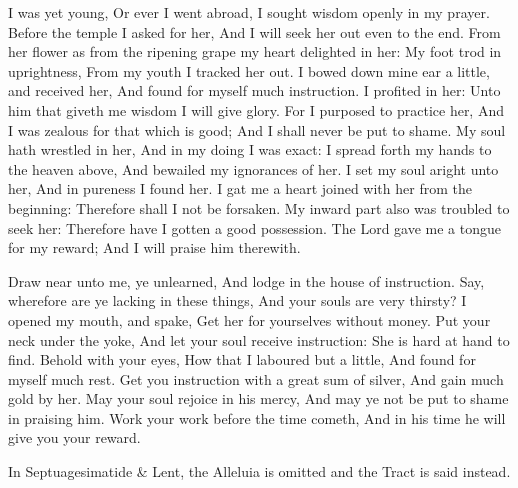  I was yet young, Or ever I went abroad, I sought wisdom openly in my prayer. Before the temple I asked for her, And I will seek her out even to the end. From her flower as from the ripening grape my heart delighted in her: My foot trod in uprightness, From my youth I tracked her out. I bowed down mine ear a little, and received her, And found for myself much instruction. I profited in her: Unto him that giveth me wisdom I will give glory. For I purposed to practice her, And I was zealous for that which is good; And I shall never be put to shame. My soul hath wrestled in her, And in my doing I was exact: I spread forth my hands to the heaven above, And bewailed my ignorances of her. I set my soul aright unto her, And in pureness I found her. I gat me a heart joined with her from the beginning: Therefore shall I not be forsaken. My inward part also was troubled to seek her: Therefore have I gotten a good possession. The Lord gave me a tongue for my reward; And I will praise him therewith.
\par
Draw near unto me, ye unlearned, And lodge in the house of instruction. Say, wherefore are ye lacking in these things, And your souls are very thirsty? I opened my mouth, and spake, Get her for yourselves without money. Put your neck under the yoke, And let your soul receive instruction: She is hard at hand to find. Behold with your eyes, How that I laboured but a little, And found for myself much rest. Get you instruction with a great sum of silver, And gain much gold by her. May your soul rejoice in his mercy, And may ye not be put to shame in praising him. Work your work before the time cometh, And in his time he will give you your reward. 


\begin{rubric}
	In Septuagesimatide \& Lent, the Alleluia is omitted and the Tract is said instead.
\end{rubric}


